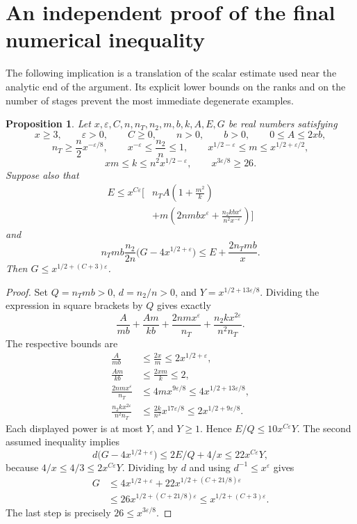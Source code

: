 \documentclass[11pt,a4paper]{article}
\newtheorem{proposition}{Proposition}[section]
\theoremstyle{remark}
\newcommand{\src}[1]{\cite{#1}}
\begin{document}
\section{An independent proof of the final numerical inequality}\label{sec:numeric}
The following implication is a translation of the scalar estimate used near the analytic end of the argument. Its explicit lower bounds on the ranks and on the number of stages prevent the most immediate degenerate examples. \src{S-size}

\begin{proposition}\label{prop:size}
Let $x,\varepsilon,C,n,n_T,n_2,m,b,k,A,E,G$ be real numbers satisfying
\[
 x\ge3,\qquad \varepsilon>0,\qquad C\ge0,\qquad n>0,\qquad b>0,
 \qquad 0\le A\le2xb,
\]
\[
 n_T\ge\frac n2x^{-\varepsilon/8},\qquad
 x^{-\varepsilon}\le\frac{n_2}{n}\le1,\qquad
 x^{1/2-\varepsilon}\le m\le x^{1/2+\varepsilon/2},
\]
\[
 xm\le k\le n^2x^{1/2-\varepsilon},\qquad
 x^{3\varepsilon/8}\ge26.
\]
Suppose also that
\begin{align*}
E\le x^{C\varepsilon}\biggl[
&n_TA\left(1+\frac{m^2}{k}\right)\\
&+m\left(2nmbx^\varepsilon+
 \frac{n_2kbx^\varepsilon}{n^2x^{-\varepsilon}}\right)\biggr]
\end{align*}
and
\[
 n_Tmb\frac{n_2}{2n}\bigl(G-4x^{1/2+\varepsilon}\bigr)
       \le E+\frac{2n_Tmb}{x}.
\]
Then $G\le x^{1/2+(C+3)\varepsilon}$.
\end{proposition}
\begin{proof}
Set $Q=n_Tmb>0$, $d=n_2/n>0$, and $Y=x^{1/2+13\varepsilon/8}$. Dividing the expression in square brackets by $Q$ gives exactly
\[
 \frac{A}{mb}+\frac{Am}{kb}
 +\frac{2nmx^\varepsilon}{n_T}
 +\frac{n_2kx^{2\varepsilon}}{n^2n_T}.
\]
The respective bounds are
\begin{align*}
 \frac{A}{mb}&\le\frac{2x}{m}\le2x^{1/2+\varepsilon},\\
 \frac{Am}{kb}&\le\frac{2xm}{k}\le2,\\
 \frac{2nmx^\varepsilon}{n_T}&\le4mx^{9\varepsilon/8}
                  \le4x^{1/2+13\varepsilon/8},\\
 \frac{n_2kx^{2\varepsilon}}{n^2n_T}
       &\le\frac{2k}{n^2}x^{17\varepsilon/8}
                  \le2x^{1/2+9\varepsilon/8}.
\end{align*}
Each displayed power is at most $Y$, and $Y\ge1$. Hence $E/Q\le10x^{C\varepsilon}Y$. The second assumed inequality implies
\[
 d\bigl(G-4x^{1/2+\varepsilon}\bigr)
       \le 2E/Q+4/x
       \le22x^{C\varepsilon}Y,
\]
because $4/x\le4/3\le2x^{C\varepsilon}Y$. Dividing by $d$ and using $d^{-1}\le x^\varepsilon$ gives
\begin{align*}
 G&\le4x^{1/2+\varepsilon}
           +22x^{1/2+(C+21/8)\varepsilon}\\
  &\le26x^{1/2+(C+21/8)\varepsilon}
   \le x^{1/2+(C+3)\varepsilon}.
\end{align*}
The last step is precisely $26\le x^{3\varepsilon/8}$.
\end{proof}
\end{document}
